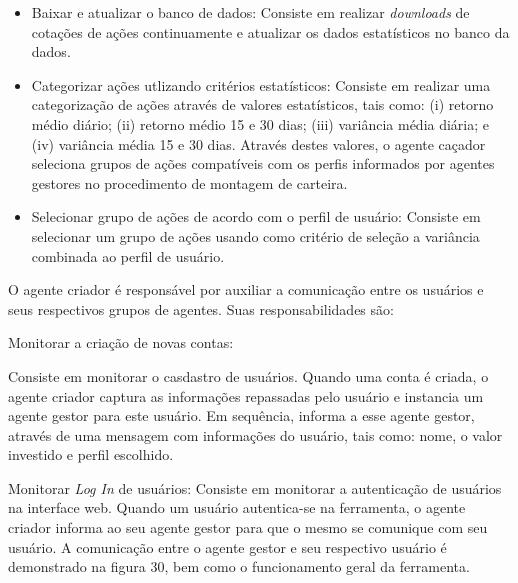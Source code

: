 \begin{description}
\begin{itemize}
\item Baixar e atualizar o banco de dados:\newline
Consiste em realizar \textit{downloads} de cotações de ações continuamente e atualizar os dados estatísticos no banco da dados. 
\item Categorizar ações utlizando critérios estatísticos:\newline
Consiste em realizar uma categorização de ações através de valores estatísticos, tais como: (i) retorno médio diário; (ii) retorno médio 15 e 30 dias; (iii) variância média diária; e (iv) variância média 15 e 30 dias. Através destes valores, o agente caçador seleciona grupos de ações compatíveis com os perfis informados por agentes gestores no procedimento de montagem de carteira.
\item Selecionar grupo de ações de acordo com o perfil de usuário:\newline
Consiste em selecionar um grupo de ações usando como critério de seleção a variância combinada ao perfil de usuário.
\end{itemize}

\item[Agente criador (criator):]
 O agente criador é responsável por auxiliar a comunicação entre os usuários e seus respectivos grupos de agentes. Suas responsabilidades são: 

\item Monitorar a criação de novas contas:\newline

Consiste em monitorar o casdastro de usuários. Quando uma conta é criada, o agente criador captura as informações repassadas pelo usuário e instancia um agente gestor para este usuário. Em sequência, informa a esse agente gestor, através de uma mensagem com informações do usuário, tais como: nome, o valor investido e perfil escolhido.

\item Monitorar \textit{Log In} de usuários:\newline
Consiste em monitorar a autenticação de usuários na interface web. Quando um usuário autentica-se na ferramenta, o agente criador informa ao seu agente gestor para que o mesmo se comunique com seu usuário. A comunicação entre o agente gestor e seu respectivo usuário é demonstrado na figura 30, bem como o funcionamento geral da ferramenta.

\end{description}

